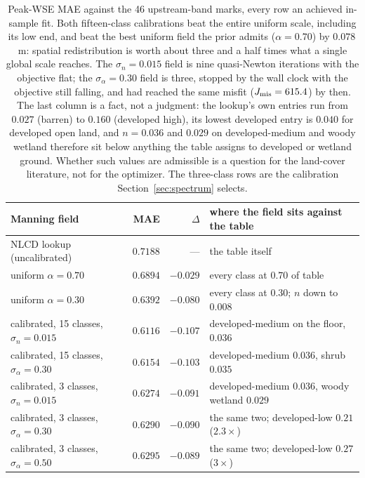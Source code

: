 \documentclass[11pt]{article}
\begin{document}
\begin{table}
\centering\small
\begin{tabular}{@{}lrrl@{}}
\toprule
Manning field & MAE & $\Delta$ & where the field sits against the table \\
\midrule
NLCD lookup (uncalibrated) & $0.7188$ & --- & the table itself \\
uniform $\alpha = 0.70$ & $0.6894$ & $-0.029$ & every class at $0.70$ of table \\
uniform $\alpha = 0.30$ & $0.6392$ & $-0.080$ & every class at $0.30$; $n$ down to $0.008$ \\
calibrated, 15 classes, $\sigma_n = 0.015$ & $0.6116$ & $-0.107$ & developed-medium on the floor, $0.036$ \\
calibrated, 15 classes, $\sigma_\alpha = 0.30$ & $0.6154$ & $-0.103$ & developed-medium $0.036$, shrub $0.035$ \\
calibrated, 3 classes, $\sigma_n = 0.015$ & $0.6274$ & $-0.091$ & developed-medium $0.036$, woody wetland $0.029$ \\
calibrated, 3 classes, $\sigma_\alpha = 0.30$ & $0.6290$ & $-0.090$ & the same two; developed-low $0.21$ ($2.3\times$) \\
calibrated, 3 classes, $\sigma_\alpha = 0.50$ & $0.6295$ & $-0.089$ & the same two; developed-low $0.27$ ($3\times$) \\
\bottomrule
\end{tabular}
\caption{Peak-WSE MAE against the 46 upstream-band marks, every row an
achieved in-sample fit. Both fifteen-class calibrations beat the entire
uniform scale, including its low end, and beat the best
uniform field the prior admits ($\alpha = 0.70$) by $0.078$\,m: spatial
redistribution is worth about three and a half times what a single
global scale reaches. The $\sigma_n = 0.015$ field is nine
quasi-Newton iterations with the objective flat; the
$\sigma_\alpha = 0.30$ field is three, stopped by the wall clock with
the objective still falling, and had reached the same misfit
($J_{\rm mis} = 615.4$) by then. The last column is a fact, not
a judgment: the lookup's own entries run from $0.027$ (barren) to
$0.160$ (developed high), its lowest developed entry is $0.040$ for
developed open land, and $n = 0.036$ and $0.029$ on developed-medium
and woody wetland therefore sit below anything the table assigns to
developed or wetland ground. Whether such values are admissible is a
question for the land-cover literature, not for the optimizer. The
three-class rows are the calibration Section~\ref{sec:spectrum}
selects.}
\label{tab:ladder}
\end{table}
\end{document}

